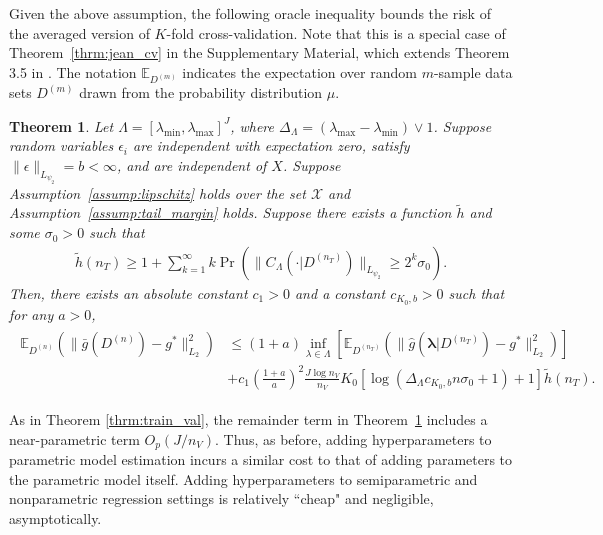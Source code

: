 \documentclass[12pt]{article} %
\newtheorem{theorem}{Theorem}
\theoremstyle{definition}
\begin{document}
Given the above assumption, the following oracle inequality bounds the risk of the averaged version of $K$-fold cross-validation.
Note that this is a special case of Theorem~\ref{thrm:jean_cv} in the Supplementary Material, which extends Theorem 3.5 in \citet{lecue2012oracle}.
The notation $\mathbb{E}_{D^{(m)}}$ indicates the expectation over random $m$-sample data sets $D^{(m)}$ drawn from the probability distribution $\mu$.
\begin{theorem}
	\label{thrm:kfold}
	Let $\Lambda=[\lambda_{\min},\lambda_{\max}]^{J}$, where $\Delta_{\Lambda} = (\lambda_{\max} - \lambda_{\min}) \vee 1$.
	Suppose random variables $\epsilon_i$ are independent with expectation zero, satisfy $\|\epsilon\|_{L_{\psi_2}}= b <\infty$, and are independent of $X$.
	Suppose Assumption~\ref{assump:lipschitz} holds over the set $\mathcal{X}$ and Assumption~\ref{assump:tail_margin} holds.
	Suppose there exists a function $\tilde{h}$ and some $\sigma_0 > 0$ such that
	\begin{align}
	\tilde{h}(n_{T})
	\ge
	1 + \sum_{k=1}^{\infty}
	k\Pr\left(\|C_\Lambda(\cdot |D^{(n_{T})})\|_{L_{\psi_{2}}}\ge2^{k}\sigma_{0}\right).
	\label{eq:prob_bound_cv}
	\end{align}
	Then, there exists an absolute constant $c_{1}>0$ and a constant $c_{K_0, b}>0$ such that for any $a > 0$,
	\begin{align}
	\begin{split}
	\mathbb{E}_{D^{(n)}}\left(
	\|
	\bar{g}(D^{(n)})
	-g^{*}
	\|_{L_{2}}^{2}\right)
	& \le	(1+a)
	\inf_{\lambda\in\Lambda}
	\left[\mathbb{E}_{D^{(n_{T})}}\left(\|
	\hat{g}(\boldsymbol{\lambda}|D^{(n_{T})})
	-g^{*}\|_{L_{2}}^{2}\right)\right] \\
	& +
	c_{1}
	\left (\frac{1+a}{a} \right )^2
	\frac{J\log n_{V}}{n_{V}}
	K_0
	\left[\log\left(\Delta_{\Lambda} c_{K_0, b} n \sigma_0 +1\right)+1\right]
	\tilde{h}(n_{T}).
	\end{split}
	\label{eq:cv_lipschitz_oracle_ineq}
	\end{align}
\end{theorem}

As in Theorem \ref{thrm:train_val}, the remainder term in Theorem~\ref{thrm:kfold} includes a near-parametric term $O_p(J/n_V)$.
Thus, as before, adding hyperparameters to parametric model estimation incurs a similar cost to that of adding parameters to the parametric model itself.
Adding hyperparameters to semiparametric and nonparametric regression settings is relatively ``cheap" and negligible, asymptotically.
\end{document}
